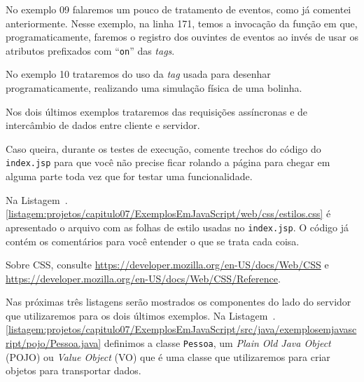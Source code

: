 No exemplo 09 falaremos um pouco de tratamento de eventos, como já comentei anteriormente. Nesse exemplo, na linha 171, temos a invocação da função\newline%
 em que, programaticamente, faremos o registro dos ouvintes de eventos ao invés de usar os atributos prefixados com ``\texttt{on}'' das \textit{tags}.

No exemplo 10 trataremos do uso da \textit{tag}  usada para desenhar programaticamente, realizando uma simulação física de uma bolinha.

Nos dois últimos exemplos trataremos das requisições assíncronas e de intercâmbio de dados entre cliente e servidor.


Caso queira, durante os testes de execução, comente trechos do código do \texttt{index.jsp} para que você não precise ficar rolando a página para chegar em alguma parte toda vez que for testar uma funcionalidade.

Na Listagem~\thechapter.\ref{listagem:projetos/capitulo07/ExemplosEmJavaScript/web/css/estilos.css} é apresentado o arquivo com as folhas de estilo usadas no \texttt{index.jsp}. O código já contém os comentários para você entender o que se trata cada coisa.


\begin{saibaMais}
    Sobre CSS, consulte \url{https://developer.mozilla.org/en-US/docs/Web/CSS} e \url{https://developer.mozilla.org/en-US/docs/Web/CSS/Reference}.
\end{saibaMais}

Nas próximas três listagens serão mostrados os componentes do lado do servidor que utilizaremos para os dois últimos exemplos. Na Listagem~\thechapter.\ref{listagem:projetos/capitulo07/ExemplosEmJavaScript/src/java/exemplosemjavascript/pojo/Pessoa.java} definimos a classe \texttt{Pessoa}, um \textit{Plain Old Java Object} (POJO) ou \textit{Value Object} (VO) que é uma classe que utilizaremos para criar objetos para transportar dados.


